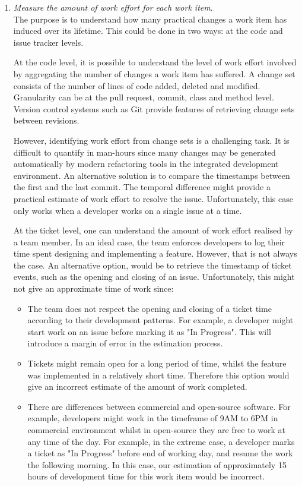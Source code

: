 \documentclass{mprop}
\begin{document}
\begin{enumerate}
	\item \textit{Measure the amount of work effort for each work item}.\\
	The purpose is to understand how many practical changes a work item has
	induced over its lifetime. This could be done in two ways: at the code and
	issue tracker levels.
	
	At the code level, it is possible to understand the level of work effort
	involved by aggregating the number of changes a work item has suffered. A
	change set consists of the number of lines of code added, deleted and
	modified. Granularity can be at the pull request, commit, class and method
	level. Version control systems such as Git provide features of retrieving
	change sets between revisions.
	
	However, identifying work effort from change sets is a challenging task. It
	is difficult to quantify in man-hours since many changes may be generated
	automatically by modern refactoring tools in the integrated development
	environment. An alternative solution is to compare the timestamps between
	the first and the last commit. The temporal difference might provide a
	practical estimate of work effort to resolve the issue. Unfortunately, this
	case only works when a developer works on a single issue at a time.

	At the ticket level, one can understand the amount of work effort realised
	by a team member. In an ideal case, the team enforces developers to log
	their time spent designing and implementing a feature. However, that is not
	always the case. An alternative option, would be to retrieve the timestamp
	of ticket events, such as the opening and closing of an issue.
	Unfortunately, this might not give an approximate time of work since: 
	\begin{itemize}
		\item The team does not respect the opening and closing of a ticket time
		according to their development patterns. For example, a developer might
		start work on an issue before marking it as "In Progress". This will
		introduce a margin of error in the estimation process.
		\item Tickets might remain open for a long period of time, whilst the
		feature was implemented in a relatively short time. Therefore this
		option would give an incorrect estimate of the amount of work completed.
		\item There are differences between commercial and open-source software.
		For example, developers might work in the timeframe of 9AM to 6PM in
		commercial environment whilst in open-source they are free to work at
		any time of the day. For example, in the extreme case, a developer marks
		a ticket as "In Progress" before end of working day, and resume the work
		the following morning. In this case, our estimation of approximately 15
		hours of development time for this work item would be incorrect.
	\end{itemize}


\end{enumerate}
\end{document}
